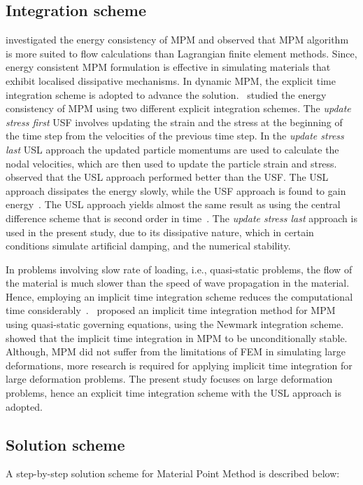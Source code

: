 \subsection{Integration scheme}

\citet{Love2006} investigated the energy consistency of MPM and observed that 
MPM algorithm is more suited to flow calculations than Lagrangian finite 
element methods. Since, energy consistent MPM formulation is effective in 
simulating materials that exhibit localised dissipative mechanisms. In dynamic 
MPM, the explicit time integration scheme is 
adopted to advance the solution.~\citet{Bardenhagen2002} studied the energy 
consistency of MPM using two 
different explicit integration schemes. The \textit{update stress first} USF
involves updating the strain and the stress at the beginning of the time step 
from the velocities of the previous time step. In the \textit{update stress 
last} USL approach the updated particle momentums are used to calculate the 
nodal velocities, which are then used to update the particle strain and 
stress.~\citet{Bardenhagen2002} observed that the USL approach performed better 
than the USF. The USL approach dissipates the energy slowly, while the USF 
approach is found to gain energy~\citep{Kafaji2013}. The USL approach yields 
almost the same result as using the central difference scheme that is second 
order in time~\citep{Wallstedt2008}. The \textit{update stress last} approach 
is used in the present study, due to its dissipative nature, which in certain 
conditions simulate artificial damping, and the numerical stability.

In problems involving slow rate of loading, i.e., quasi-static problems, the 
flow of the material is much slower than the speed of wave propagation in the 
material. Hence, employing an implicit time integration scheme reduces the 
computational time considerably~\citep{Kafaji2013}.~\citet{Guilkey2003a} 
proposed an implicit time integration method for MPM using quasi-static 
governing equations, using the Newmark integration scheme.~\citet{Love2006} 
showed that the implicit time integration in MPM to be unconditionally stable. 
Although, MPM did not suffer from the limitations of FEM in simulating large 
deformations, more research is required for applying implicit time integration 
for large deformation problems. The present study focuses on large deformation 
problems, hence an explicit time integration scheme with the USL approach is 
adopted.

\subsection{Solution scheme}
A step-by-step solution scheme for Material Point Method is described below:

